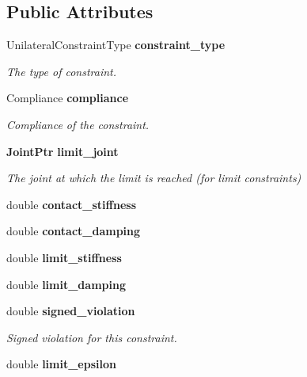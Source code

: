 \subsection*{Public Attributes}
\begin{DoxyCompactItemize}
\item 
Unilateral\-Constraint\-Type {\bf constraint\-\_\-type}\label{classMoby_1_1UnilateralConstraint_a0de861929800d6d7bbd375a8b1daa729}

\begin{DoxyCompactList}\small\item\em The type of constraint. \end{DoxyCompactList}\item 
Compliance {\bf compliance}\label{classMoby_1_1UnilateralConstraint_afd0f0de37018913a6d0928b271e648a9}

\begin{DoxyCompactList}\small\item\em Compliance of the constraint. \end{DoxyCompactList}\item 
{\bf Joint\-Ptr} {\bf limit\-\_\-joint}\label{classMoby_1_1UnilateralConstraint_a75cee3bdc087bb97b9ff6408cdb96437}

\begin{DoxyCompactList}\small\item\em The joint at which the limit is reached (for limit constraints) \end{DoxyCompactList}\item 
double {\bfseries contact\-\_\-stiffness}\label{classMoby_1_1UnilateralConstraint_ab152d096e96341234b40a9c38ecebd11}

\item 
double {\bfseries contact\-\_\-damping}\label{classMoby_1_1UnilateralConstraint_a0e675c8571eeabf65877e911082971e9}

\item 
double {\bfseries limit\-\_\-stiffness}\label{classMoby_1_1UnilateralConstraint_a7c6dc88ea4861889326331ec20a079b4}

\item 
double {\bfseries limit\-\_\-damping}\label{classMoby_1_1UnilateralConstraint_a36dcd3dd86fc85f33a0c5959b6336ffc}

\item 
double {\bf signed\-\_\-violation}\label{classMoby_1_1UnilateralConstraint_a0af4ea58e0eea332a24ff9b21ebc42ed}

\begin{DoxyCompactList}\small\item\em Signed violation for this constraint. \end{DoxyCompactList}\item 
double {\bf limit\-\_\-epsilon}\label{classMoby_1_1UnilateralConstraint_a39eb8c3525c3bd314d72dff5f8212dac}


\end{DoxyCompactItemize}
